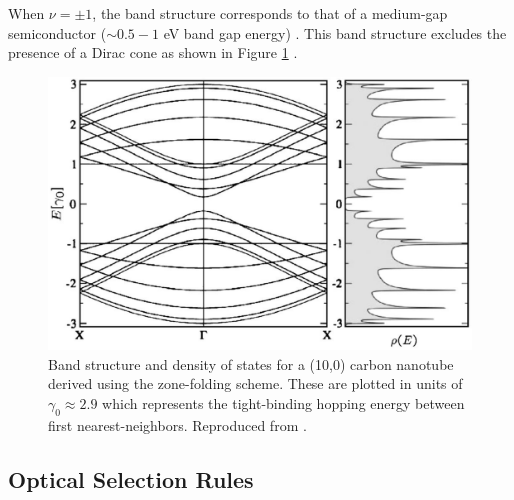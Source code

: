 When $\nu= \pm 1$, the band structure corresponds to that of a medium-gap semiconductor ($\sim0.5 - 1$ eV band gap energy) \cite{nanot2012optoelectronic}. This band structure excludes the presence of a Dirac cone as shown in Figure \ref{fig:ten_zero_cnt}  \cite{charlier2007electronic}.



\begin{figure}[ht]
	\centering
	\includegraphics[scale=0.33]{images/chapter_optical_props/ten_zero_band_charlier}
	\caption{Band structure and density of states for a (10,0) carbon nanotube derived using the zone-folding scheme. These are plotted in units of $\gamma_0 \approx 2.9$ which represents the tight-binding hopping energy between first nearest-neighbors. Reproduced from \cite{charlier2007electronic}.}
	\label{fig:ten_zero_cnt}
\end{figure}


\subsection{Optical Selection Rules}
\label{section:selection_rules}


